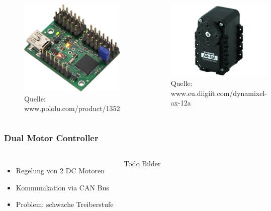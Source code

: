 \begin{frame}
	\begin{columns}[t]
		\begin{figure}
			\centering
			\includegraphics[width=0.7\columnwidth]{../images/maestroServoController.jpg}
			\caption{Quelle: www.pololu.com/product/1352}
		\end{figure}
		\begin{figure}
			\centering
			\includegraphics[width=0.9\columnwidth]{../images/dynamixelAX12A.jpg}
			\caption{Quelle: www.eu.diigiit.com/dynamixel-ax-12a}
		\end{figure}
	\end{columns}
	
\end{frame}

\begin{frame}
	\frametitle{Dual Motor Controller}
	
	\begin{columns}[t]
		\begin{itemize}
			\item Regelung von 2 DC Motoren
			\item Kommunikation via CAN Bus
			\item Problem: schwache Treiberstufe
		\end{itemize}
		Todo Bilder
	\end{columns}
	
\end{frame}

